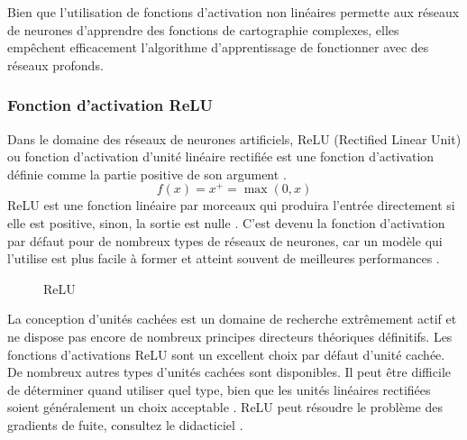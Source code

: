 	Bien que l'utilisation de fonctions d'activation non linéaires permette aux réseaux de neurones d'apprendre des fonctions de cartographie complexes, elles empêchent efficacement l'algorithme d'apprentissage de fonctionner avec des réseaux profonds.
	
	
	
	\subsubsection{Fonction d'activation ReLU}\label{subsec:relu}
	
	Dans le domaine des réseaux de neurones artificiels, ReLU (Rectified Linear Unit) ou fonction d'activation d'unité linéaire rectifiée est une fonction d'activation définie comme la partie positive de son argument \cite{goodfellow2016deep}.
	$${\displaystyle f(x)=x^{+}=\max(0,x)}$$
	ReLU est une fonction linéaire par morceaux qui produira l'entrée directement si elle est positive, sinon, la sortie est nulle \cite{tammina2019transfer}. C'est devenu la fonction d'activation par défaut pour de nombreux types de réseaux de neurones, car un modèle qui l'utilise est plus facile à former et atteint souvent de meilleures performances \cite{geron2017hands}.
	
	\begin{figure}
		\caption{ReLU}\label{fig:relu}
	\end{figure}
	
	La conception d'unités cachées est un domaine de recherche extrêmement actif et ne dispose pas encore de nombreux principes directeurs théoriques définitifs.
	Les fonctions d'activations ReLU sont un excellent choix par défaut d'unité cachée.\\De nombreux autres types d'unités cachées sont disponibles. Il peut être diﬃcile de déterminer quand utiliser quel type, bien que les unités linéaires rectiﬁées soient généralement un choix acceptable \cite{goodfellow2016deep}. ReLU peut résoudre le problème des gradients de fuite, consultez le didacticiel \cite{pretorius2018critical}.
	
